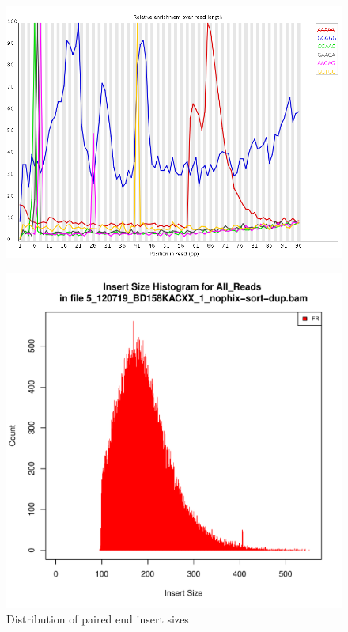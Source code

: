 \documentclass{article}
\begin{document}
    \begin{figure}[htbp]
      \centering
      \includegraphics[width=0.85\linewidth] {fastqc/5_120719_BD158KACXX_1_nophix-sort-dup_fastqc/Images/kmer_profiles.png}
      \caption{}
    \end{figure}
    \begin{figure}[htbp]
      \centering
      \includegraphics[width=0.75\linewidth] {5_120719_BD158KACXX_1_nophix-sort-dup-insert.pdf}
      \caption{Distribution of paired end insert sizes}
    \end{figure}


\FloatBarrier
\FloatBarrier
\end{document}
